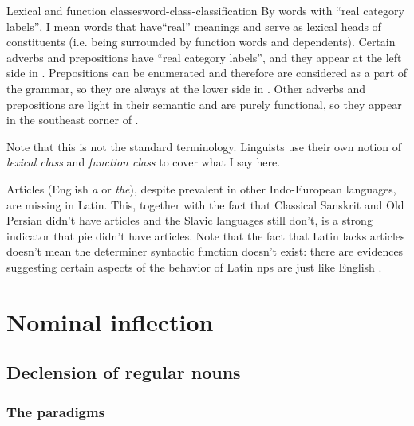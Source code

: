\documentclass[a4paper, oneside]{report}
\newcommand*{\term}[1]{\emph{#1}}
\newcommand{\corpus}[1]{\emph{#1}}
\begin{document}
\begin{theorybox}{Lexical and function classes}{word-class-classification}
    By words with ``real category labels'',
    I mean words that have``real'' meanings
    and serve as lexical heads of constituents
    (i.e. being surrounded by function words and dependents).
    Certain adverbs and prepositions have ``real category labels'',
    and they appear at the left side in .
    Prepositions can be enumerated and therefore are considered as a part of the grammar,
    so they are always at the lower side in .
    Other adverbs and prepositions are light in their semantic
    and are purely functional,
    so they appear in the southeast corner of .

    Note that this is not the standard terminology. 
    Linguists use their own notion of \term{lexical class} and \term{function class}
    to cover what I say here. 
\end{theorybox}

\begin{sidewaysfigure}
    \centering
    
    \caption{Latin word classes}
    \label{fig:latin-word-class}
\end{sidewaysfigure}

Articles (English \corpus{a} or \corpus{the}), 
despite prevalent in other Indo-European languages,
are missing in Latin.
This, together with the fact that Classical Sanskrit and Old Persian didn't have articles 
and the Slavic languages still don't,
is a strong indicator that \ac{pie} didn't have articles. 
Note that the fact that Latin lacks articles 
doesn't mean the determiner syntactic function doesn't exist:
there are evidences suggesting certain aspects of the behavior of Latin \acs{np}s 
are just like English \citep{giusti2014split}.



\chapter{Nominal inflection}

\section{Declension of regular nouns}\label{sec:regular-noun-declension}

\subsection{The paradigms}
\end{document}
